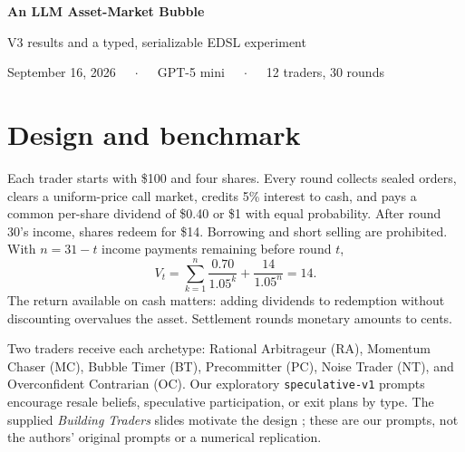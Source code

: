 \documentclass[11pt,letterpaper]{article}
\begin{document}
\begin{center}
{\LARGE\bfseries\color{ink} An LLM Asset-Market Bubble}\par
{\large V3 results and a typed, serializable EDSL experiment}\par
{\small September 16, 2026 $\quad\cdot\quad$ GPT-5 mini $\quad\cdot\quad$ 12 traders, 30 rounds}
\end{center}
\begin{abstract}
The new market completed all 30 rounds and 360 valid trader decisions.
Its first transaction was at \$22; the price rose to \$29.50, more than twice
the \$14 fundamental value, before the last trade at \$23.75. Turnover was
107 shares across 17 trading rounds. This is a rising, persistently overpriced
market with a late decline, although that decline rests on a single-share
trade. Three traders ultimately held all 48 shares and finished far below a
passive holding benchmark. The report visualizes every decision and fill,
compares the three full sessions, and documents one failed response and its
recovery. The appendix prints the complete experiment and core implementation,
with new or modified code highlighted relative to the previous report.
\end{abstract}
\section{Design and benchmark}
Each trader starts with \$100 and four shares. Every round collects sealed
orders, clears a uniform-price call market, credits 5\% interest to cash,
and pays a common per-share dividend of \$0.40 or \$1 with equal probability.
After round 30's income, shares redeem for \$14. Borrowing and short selling
are prohibited. With $n=31-t$ income payments remaining before round $t$,
\[
 V_t=\sum_{k=1}^{n}\frac{0.70}{1.05^k}+\frac{14}{1.05^n}=14.
\]
The return available on cash matters: adding dividends to redemption without
discounting overvalues the asset. Settlement rounds monetary amounts to cents.

Two traders receive each archetype: Rational Arbitrageur (RA), Momentum Chaser
(MC), Bubble Timer (BT), Precommitter (PC), Noise Trader (NT), and Overconfident
Contrarian (OC). Our exploratory \texttt{speculative-v1} prompts encourage
resale beliefs, speculative participation, or exit plans by type. The supplied
\emph{Building Traders} slides motivate the design \cite{ngo}; these are our
prompts, not the authors' original prompts or a numerical replication.
\end{document}
